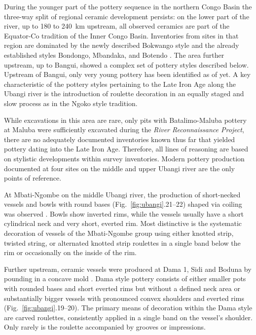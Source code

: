 \documentclass[smallextended,natbib]{svjour3}       %
\begin{document}
During the younger part of the pottery sequence in the northern Congo Basin the three-way split of regional ceramic development persists: on the lower part of the river, up to 180 to 240~km upstream, all observed ceramics are part of the Equator-Co tradition of the Inner Congo Basin. Inventories from sites in that region are dominated by the newly described Bokwango style and the already established styles Bondongo, Mbandaka, and Botendo \citep[96--98, 172--181]{Seidensticker.2021e}. The area further upstream, up to Bangui, showed a complex set of pottery styles described below. Upstream of Bangui, only very young pottery has been identified as of yet. A key characteristic of the pottery styles pertaining to the Late Iron Age along the Ubangi river is the introduction of roulette decoration in an equally staged and slow process as in the Ngoko style tradition. 

While excavations in this area are rare, only pits with Batalimo-Maluba pottery at Maluba were sufficiently excavated during the \textit{River Reconnaissance Project}, there are no adequately documented inventories known thus far that yielded pottery dating into the Late Iron Age. Therefore, all lines of reasoning are based on stylistic developments within survey inventories. Modern pottery production documented at four sites on the middle and upper Ubangi river are the only points of reference.

At Mbati-Ngombe on the middle Ubangi river, the production of short-necked vessels and bowls with round bases (Fig.~\ref{fig:ubangi}.21--22) shaped via coiling was observed \citep[109--121]{Seidensticker.2021e}. Bowls show inverted rims, while the vessels usually have a short cylindrical neck and very short, everted rim. Most distinctive is the systematic decoration of vessels of the Mbati-Ngombe group using either knotted strip, twisted string, or alternated knotted strip roulettes \citep[88--105]{LivingstoneSmith.2010b} in a single band below the rim or occasionally on the inside of the rim.

Further upstream, ceramic vessels were produced at Dama 1, Sidi and Boduna by pounding in a concave mold \citep[69 Ftn.~101]{Seidensticker.2021e}. Dama style pottery \citep[104--109]{Seidensticker.2021e} consists of either smaller pots with rounded bases and short everted rims but without a defined neck area or substantially bigger vessels with pronounced convex shoulders and everted rims (Fig.~\ref{fig:ubangi}.19--20). The primary means of decoration within the Dama style are carved roulettes, consistently applied in a single band on the vessel’s shoulder. Only rarely is the roulette accompanied by grooves or impressions.
\end{document}
